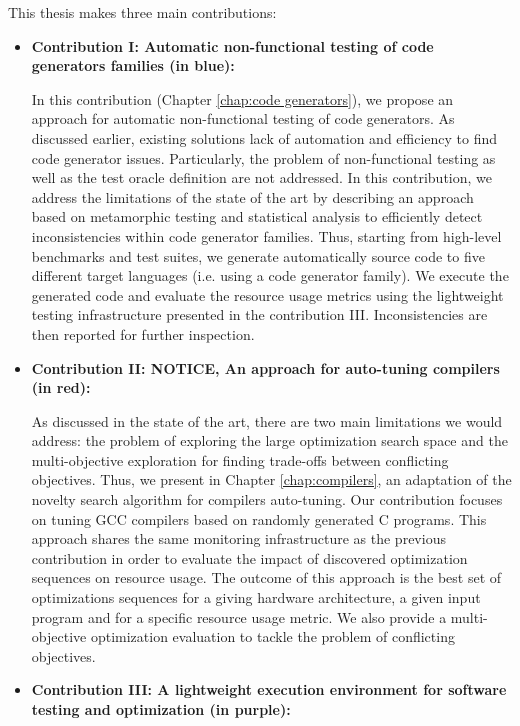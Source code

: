 This thesis makes three main contributions:
\begin{itemize}
	\item \textbf{Contribution I: Automatic non-functional testing of code generators families (in blue): }
	
	In this contribution (Chapter \ref{chap:code generators}), we propose an approach for automatic non-functional  testing of code generators. As discussed earlier, existing solutions lack of automation and efficiency to find code generator issues. Particularly, the problem of non-functional testing as well as the test oracle definition are not addressed. In this contribution, we address the limitations of the state of the art by describing an approach based on metamorphic testing and statistical analysis to efficiently detect inconsistencies within code generator families.
	Thus, starting from high-level benchmarks and test suites, we generate automatically source code to five different target languages (i.e. using a code generator family). We execute the generated code and evaluate the resource usage metrics using the lightweight testing infrastructure presented in the contribution III. Inconsistencies are then reported for further inspection.  
	
	\item \textbf{Contribution II: NOTICE, An approach for auto-tuning compilers (in red):}
	
	As discussed in the state of the art, there are two main limitations we would address: the problem of exploring the large optimization search space and the multi-objective exploration for finding trade-offs between conflicting objectives. 
	Thus, we present in Chapter \ref{chap:compilers}, an adaptation of the novelty search algorithm for compilers auto-tuning. Our contribution focuses on tuning GCC compilers based on randomly generated C programs.
	This approach shares the same monitoring infrastructure as the previous contribution in order to evaluate the impact of discovered optimization sequences on resource usage. The outcome of this approach is the best set of optimizations sequences for a giving hardware architecture, a given input program and for a specific resource usage metric. We also provide a multi-objective optimization evaluation to tackle the problem of conflicting objectives.
	
	\item \textbf{Contribution III: A lightweight execution environment for software testing and optimization (in purple):}
	

\end{itemize}
